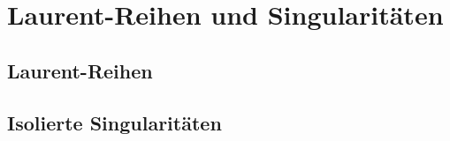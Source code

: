 \section{Laurent-Reihen und Singularitäten}

\subsection{Laurent-Reihen}

\subsection{Isolierte Singularitäten}
